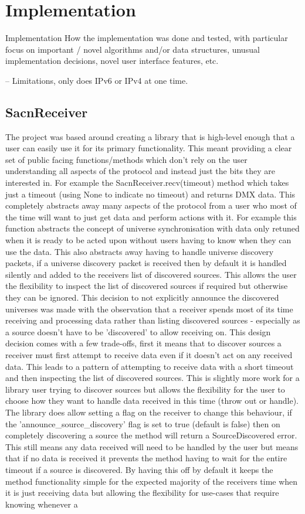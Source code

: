 \documentclass[11pt,a4paper]{report}
\begin{document}
\section{Implementation}
Implementation
How the implementation was done and tested, with particular focus on important / novel algorithms and/or data structures, unusual implementation decisions, novel user interface features, etc.

-- Limitations, only does IPv6 or IPv4 at one time.

	
\subsection{SacnReceiver}
The project was based around creating a library that is high-level enough that a user can easily use it for its primary functionality. This meant providing a clear set of public facing functions/methods which don't rely on the user understanding all aspects of the protocol and instead just the bits they are interested in. For example the SacnReceiver.recv(timeout) method which takes just a timeout (using None to indicate no timeout) and returns DMX data. This completely abstracts away many aspects of the protocol from a user who most of the time will want to just get data and perform actions with it. For example this function abstracts the concept of universe synchronisation with data only retuned when it is ready to be acted upon without users having to know when they can use the data. This also abstracts away having to handle universe discovery packets, if a universe discovery packet is received then by default it is handled silently and added to the receivers list of discovered sources. This allows the user the flexibility to inspect the list of discovered sources if required but otherwise they can be ignored. This decision to not explicitly announce the discovered universes was made with the observation that a receiver spends most of its time receiving and processing data rather than listing discovered sources - especially as a source doesn't have to be 'discovered' to allow receiving on. This design decision comes with a few trade-offs, first it means that to discover sources a receiver must first attempt to receive data even if it doesn't act on any received data. This leads to a pattern of attempting to receive data with a short timeout and then inspecting the list of discovered sources. This is slightly more work for a library user trying to discover sources but allows the flexibility for the user to choose how they want to handle data received in this time (throw out or handle). The library does allow setting a flag on the receiver to change this behaviour, if the 'announce\_source\_discovery' flag is set to true (default is false) then on completely discovering a source the method will return a SourceDiscovered error. This still means any data received will need to be handled by the user but means that if no data is received it prevents the method having to wait for the entire timeout if a source is discovered. By having this off by default it keeps the method functionality simple for the expected majority of the receivers time when it is just receiving data but allowing the flexibility for use-cases that require knowing whenever a 
\end{document}
